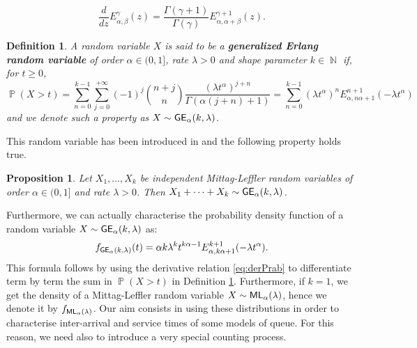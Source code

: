 \documentclass[]{amsart}
\numberwithin{equation}{section}
\newtheorem{defn}{Definition}[section]
\newtheorem{prop}[thm]{Proposition}
\theoremstyle{remark}
\theoremstyle{definition}
\DeclareMathOperator{\N}{\mathbb{N}}
\DeclareMathOperator{\bP}{\mathbb{P}}
\newcommand{\der}[2]{\frac{d #1}{d #2}}
\begin{document}
\begin{equation}\label{eq:derPrab}
	\der{}{z}E^{\gamma}_{\alpha,\beta}(z)=\frac{\Gamma(\gamma+1)}{\Gamma(\gamma)}E^{\gamma+1}_{\alpha,\alpha+\beta}(z).
\end{equation}
\begin{defn}\label{def:GE}
	A random variable $X$ is said to be a \textbf{generalized Erlang random variable} of order $\alpha \in (0,1]$, rate $\lambda>0$ and shape parameter $k \in \N$ if, for $t \ge 0$,
	\begin{equation*}
		\bP(X>t)=\sum_{n=0}^{k-1}\sum_{j=0}^{+\infty}(-1)^j\binom{n+j}{n}\frac{(\lambda t^{\alpha})^{j+n}}{\Gamma(\alpha(j+n)+1)}=\sum_{n=0}^{k-1}(\lambda t^{\alpha})^n E_{\alpha,n\alpha+1}^{n+1}(-\lambda t^\alpha)
	\end{equation*}
	and we denote such a property as $X \sim {\sf GE}_\alpha(k,\lambda)$.
\end{defn}
This random variable has been introduced in \cite{mainardi2004fractional} and the following property holds true.
\begin{prop}
	Let $X_1,\dots,X_k$ be independent Mittag-Leffler random variables of order $\alpha \in (0,1]$ and rate $\lambda>0$. Then $X_1+\cdots+X_k \sim {\sf GE}_\alpha(k,\lambda)$.
\end{prop}
Furthermore, we can actually characterise the probability density function of a random variable $X \sim {\sf GE}_\alpha(k,\lambda)$ as:
\begin{equation}\label{eq:densGE}
	f_{{\sf GE}_\alpha(k,\lambda)}(t)=\alpha k \lambda^k t^{k\alpha-1}E_{\alpha,k\alpha+1}^{k+1}(-\lambda t^\alpha).
\end{equation}
This formula follows by using the derivative relation \eqref{eq:derPrab} to differentiate term by term the sum in $\bP(X>t)$ in Definition \ref{def:GE}. Furthermore, if $k=1$, we get the density of a Mittag-Leffler random variable $X \sim {\sf ML}_\alpha(\lambda)$, hence we denote it by $f_{{\sf ML}_\alpha(\lambda)}$.
Our aim consists in using these distributions in order to characterise inter-arrival and service times of some models of queue. For this reason, we need also to introduce a very special counting process.
\end{document}
